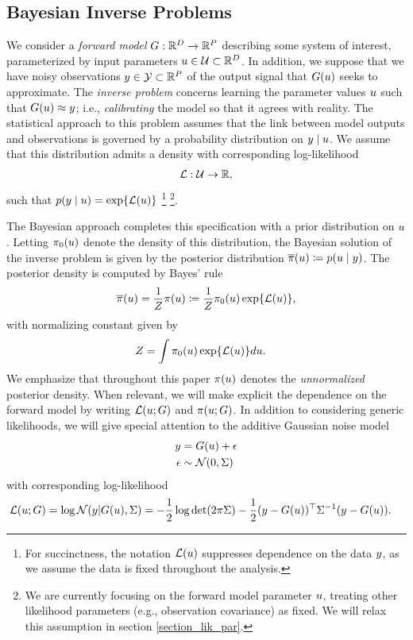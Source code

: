 \documentclass[12pt]{article}
\begin{document}
\subsection{Bayesian Inverse Problems}
We consider a \textit{forward model} $G: \mathbb{R}^{D} \to \mathbb{R}^{P}$ describing some system of interest, parameterized by 
input parameters $u \in \mathcal{U} \subset \mathbb{R}^{D}$. In addition, we suppose that we have noisy observations 
$y \in \mathcal{Y} \subset \mathbb{R}^{P}$ of the output signal that $G(u)$ seeks to approximate. The 
\textit{inverse problem} concerns learning the parameter values $u$ such that $G(u) \approx y$; i.e., \textit{calibrating}
the model so that it agrees with reality. The statistical approach to this problem assumes that the link between model outputs and 
observations is governed by a probability distribution on  $y \mid u$. We assume that this distribution admits a density 
with corresponding log-likelihood 
\begin{align}
\mathcal{L}: \mathcal{U} \to \mathbb{R}, \label{log_likelihood}
\end{align}
such that $p(y \mid u) = \exp\mathopen{}\left\{\mathcal{L}(u)\right\}\mathclose{}$ 
\footnote{For succinctness, the notation $\mathcal{L}(u)$ suppresses dependence on the data $y$, 
as we assume the data is fixed throughout the analysis.}
\footnote{We are currently focusing on the forward model parameter $u$, treating other likelihood 
parameters (e.g., observation covariance) as fixed. We will relax this assumption 
in section \ref{section_lik_par}.}.

The Bayesian approach completes this specification with a prior distribution 
on $u$. Letting $\pi_0(u)$ denote the density of this distribution, the Bayesian solution of the inverse problem is given 
by the posterior distribution $\overline{\pi}(u) \coloneqq p(u \mid y)$. The posterior density is computed by Bayes' rule 
\begin{align}
\overline{\pi}(u) = \frac{1}{Z}\pi(u) \coloneqq \frac{1}{Z} \pi_0(u) \exp\mathopen{}\left\{\mathcal{L}(u)\right\}\mathclose{}, \label{post_dens}
\end{align}
with normalizing constant given by 
\begin{align}
Z &= \int \pi_0(u) \exp\mathopen{}\left\{\mathcal{L}(u)\right\}\mathclose{} du. \label{norm_cst}
\end{align}
We emphasize that throughout this paper $\pi(u)$ denotes the \textit{unnormalized} 
posterior density. When relevant, we will make explicit the dependence on the forward 
model by writing $\mathcal{L}(u; G)$ and $\pi(u; G)$. In addition to considering 
generic likelihoods, we will give special attention to the additive Gaussian noise model
\begin{align}
y &= G(u) + \epsilon \label{inv_prob_Gaussian} \\
\epsilon &\sim \mathcal{N}(0, \Sigma) \nonumber 
\end{align}
with corresponding log-likelihood 
\begin{align}
\mathcal{L}(u; G) &= \log\mathcal{N}(y| G(u), \Sigma) 
= -\frac{1}{2} \log\det (2\pi \Sigma) - \frac{1}{2} (y - G(u))^\top \Sigma^{-1} (y - G(u)). \label{llik_Gaussian}
\end{align}
\end{document}

